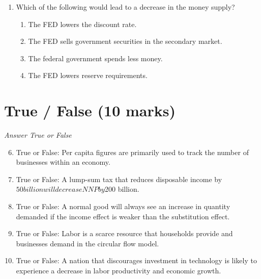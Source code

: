 \documentclass[12pt]{article}
\begin{document}
\begin{enumerate}[label=\arabic*.]
\begin{enumerate}[label=(\alph*)]
    \item It will be located in the middle of the equilibrium price.
    \item It will be located below the equilibrium price.
    \item It will be located above the equilibrium price.
    \item It will be located above the market price.
    \item It is used when the equilibrium price is too high.
\end{enumerate}
\item Which of the following would lead to a decrease in the money supply?
\begin{enumerate}[label=(\alph*)]
    \item The FED lowers the discount rate.
    \item The FED sells government securities in the secondary market.
    \item The federal government spends less money.
    \item The FED lowers reserve requirements.
\end{enumerate}
\end{enumerate}

\section*{True / False (10 marks)}
\textit{Answer True or False}
\begin{enumerate}[label=\arabic*.]
\setcounter{enumi}{5}
\item True or False: Per capita figures are primarily used to track the number of businesses within an economy.
\item True or False: A lump-sum tax that reduces disposable income by $50 billion will decrease NNP by $200 billion.
\item True or False: A normal good will always see an increase in quantity demanded if the income effect is weaker than the substitution effect.
\item True or False: Labor is a scarce resource that households provide and businesses demand in the circular flow model.
\item True or False: A nation that discourages investment in technology is likely to experience a decrease in labor productivity and economic growth.
\end{enumerate}
\end{document}
